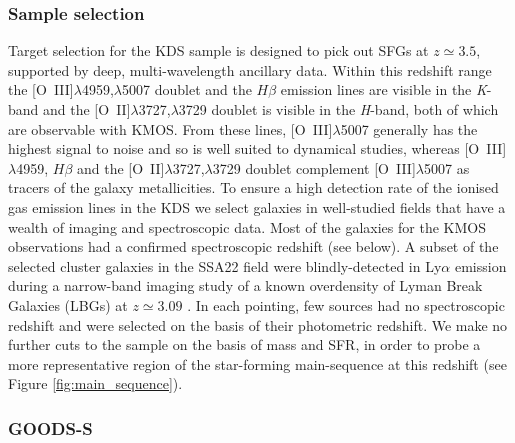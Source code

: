 \documentclass[fleqn,usenatbib]{mnras}
\begin{document}
\subsubsection{Sample selection}\label{subsubsec:sample_selection}
Target selection for the KDS sample is designed to pick out SFGs at $z\simeq3.5$, supported by deep, multi-wavelength ancillary data.
Within this redshift range the [O~{\sc III}]$\lambda$4959,$\lambda$5007 doublet and the $H\beta$ emission lines are visible in the {\it K}-band and the [O~{\sc II}]$\lambda$3727,$\lambda$3729 doublet is visible in the {\it H}-band, both of which are observable with KMOS.
From these lines, [O~{\sc III}]$\lambda$5007 generally has the highest signal to noise and so is well suited to dynamical studies, whereas [O~{\sc III}]$\lambda$4959, $H\beta$ and the [O~{\sc II}]$\lambda$3727,$\lambda$3729 doublet complement [O~{\sc III}]$\lambda$5007 as tracers of the galaxy metallicities. 
To ensure a high detection rate of the ionised gas emission lines in the KDS we select galaxies in well-studied fields that have a wealth of imaging and spectroscopic data.
Most of the galaxies for the KMOS observations had a confirmed spectroscopic redshift (see below).
A subset of the selected cluster galaxies in the SSA22 field were blindly-detected in Ly$\alpha$ emission during a narrow-band imaging study of a known overdensity of Lyman Break Galaxies (LBGs) at $z\simeq3.09$ \citep{Steidel2000}.
In each pointing, few sources had no spectroscopic redshift and were selected on the basis of their photometric redshift.
We make no further cuts to the sample on the basis of mass and SFR, in order to probe a more representative region of the star-forming main-sequence at this redshift (see Figure \ref{fig:main_sequence}).

\subsubsection{GOODS-S}\label{subsubsec:sample_selection_goods}
\end{document}
